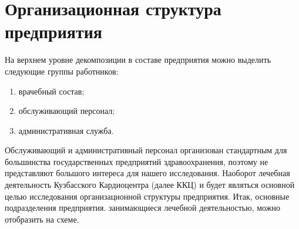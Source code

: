 \section{Организационная структура предприятия}
На верхнем уровне декомпозиции в составе предприятия можно выделить следующие
группы работников:

\begin{enumerate}
\item врачебный состав; 
\item обслуживающий персонал; 
\item административная служба.
\end{enumerate}

Обслуживающий и административный персонал организован стандартным для
большинства государственных предприятий здравоохранения, поэтому не представляют
большого интереса для нашего исследования.
Наоборот лечебная деятельность Кузбасского Кардиоцентра (далее ККЦ) и будет
являться основной целью исследования организационной структуры предприятия.
Итак, основные подразделения предприятия. занимающиеся лечебной деятельностью,
можно отобразить на схеме.